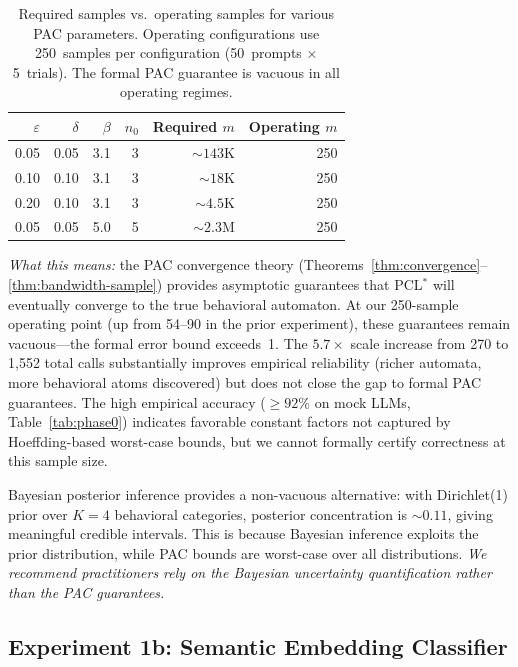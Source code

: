 \documentclass[11pt]{article}
\newcommand{\pclstar}{PCL$^*$}
\begin{document}
\begin{table}[t]
\centering
\caption{Required samples vs.\ operating samples for various
  PAC parameters.  Operating configurations use 250~samples
  per configuration (50~prompts $\times$ 5~trials).  The formal
  PAC guarantee is vacuous in all operating regimes.}
\label{tab:pac-gap}
\small
\begin{tabular}{@{}rrrrrr@{}}
\toprule
$\varepsilon$ & $\delta$ & $\beta$ & $n_0$ & Required $m$ & Operating $m$ \\
\midrule
0.05 & 0.05 & 3.1 & 3 & ${\sim}143$K & 250 \\
0.10 & 0.10 & 3.1 & 3 & ${\sim}18$K & 250 \\
0.20 & 0.10 & 3.1 & 3 & ${\sim}4.5$K & 250 \\
0.05 & 0.05 & 5.0 & 5 & ${\sim}2.3$M & 250 \\
\bottomrule
\end{tabular}
\end{table}

\emph{What this means:} the PAC convergence theory
(Theorems~\ref{thm:convergence}--\ref{thm:bandwidth-sample}) provides
asymptotic guarantees that \pclstar{} will eventually converge to the
true behavioral automaton.  At our 250-sample operating point
(up from 54--90 in the prior experiment),
these guarantees remain vacuous---the formal error bound exceeds~1.
The $5.7{\times}$ scale increase from 270 to 1{,}552 total calls
substantially improves empirical reliability (richer automata,
more behavioral atoms discovered) but does not close the gap to
formal PAC guarantees.
The high empirical accuracy (${\ge}92\%$ on mock LLMs,
Table~\ref{tab:phase0}) indicates favorable constant factors
not captured by Hoeffding-based worst-case bounds, but we cannot
formally certify correctness at this sample size.

Bayesian posterior inference provides a non-vacuous alternative:
with Dirichlet(1) prior over $K{=}4$ behavioral categories,
posterior concentration is ${\sim}0.11$, giving meaningful credible
intervals.  This is because Bayesian inference exploits the prior
distribution, while PAC bounds are worst-case over all distributions.
\emph{We recommend practitioners rely on the Bayesian uncertainty
quantification rather than the PAC guarantees.}

\subsection{Experiment 1b: Semantic Embedding Classifier}\label{sec:embedding-classifier}
\end{document}

